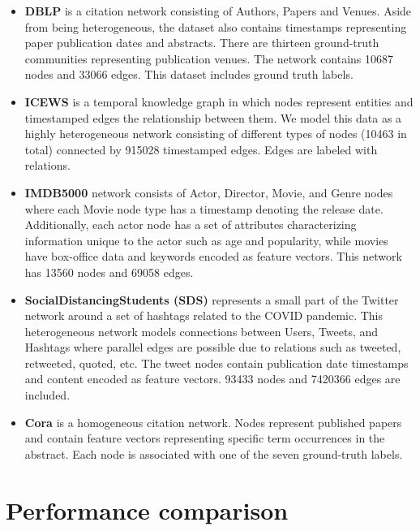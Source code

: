 \begin{itemize}[leftmargin=*]
    \item \textbf{DBLP} \cite{yangDefiningEvaluatingNetwork2012} is a citation network consisting of Authors, Papers and Venues. Aside from being heterogeneous, the dataset also contains timestamps representing paper publication dates and abstracts. There are thirteen ground-truth communities representing publication venues. The  network contains 10687 nodes and 33066 edges. This dataset includes ground truth labels.
    \item \textbf{ICEWS} \cite{garcia-duranLearningSequenceEncoders2018}
    is a temporal knowledge graph in which nodes represent entities and timestamped edges the relationship between them. We model this data as a highly heterogeneous network consisting of different types of nodes (10463 in total) connected by 915028 timestamped edges. Edges are labeled with relations. 
    \item \textbf{IMDB5000} \cite{IMDB5000Movie} network consists of Actor, Director, Movie, and Genre nodes where each Movie node type has a timestamp denoting the release date. Additionally, each actor node has a set of attributes characterizing information unique to the actor such as age and popularity, while movies have box-office data and keywords encoded as feature vectors. This network has 13560 nodes and 69058 edges. 
    \item \textbf{SocialDistancingStudents (SDS)} \cite{wangPublicSentimentGovernmental2020} represents a small part of the Twitter network around a set of hashtags related to the COVID pandemic. This heterogeneous network models connections between Users, Tweets, and Hashtags where parallel edges are possible due to relations such as tweeted, retweeted, quoted, etc. The tweet nodes contain publication date timestamps and content encoded as feature vectors. 93433 nodes and 7420366 edges are included. 
   \item \textbf{Cora} \cite{yangRevisitingSemisupervisedLearning2016} is a homogeneous citation network. Nodes represent published papers and contain feature vectors representing specific term occurrences in the abstract. Each node is associated with one of the seven ground-truth labels. 
\end{itemize}

\section{Performance comparison}


